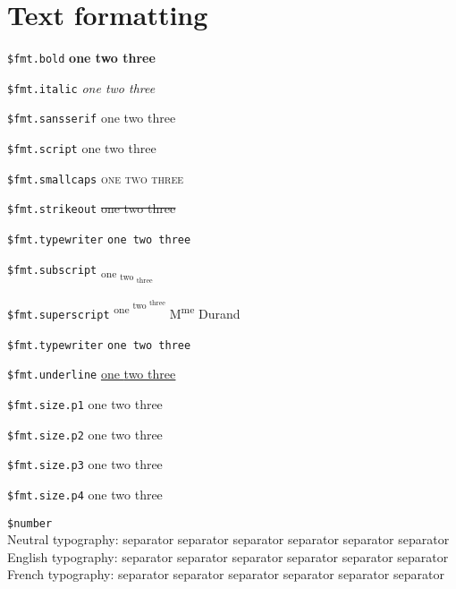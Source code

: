 \documentclass[demo]{pyscribe}
\newcommand\scripttext[1]{{\fontfamily{pzc}\selectfont\large#1}}
\begin{document}
\section{Text formatting}



\par\medskip
\texttt{\$fmt.bold}  \textbf{one
 \textbf{two
 \textbf{three}}}
\par\medskip
\texttt{\$fmt.italic}  \textit{one
 \textit{two
 \textit{three}}}
\par\medskip
\texttt{\$fmt.sansserif}  \textsf{one
 \textsf{two
 \textsf{three}}}
\par\medskip
\texttt{\$fmt.script}  \scripttext{one
 \scripttext{two
 \scripttext{three}}}
\par\medskip
\texttt{\$fmt.smallcaps}  \textsc{one
 \textsc{two
 \textsc{three}}}
\par\medskip
\texttt{\$fmt.strikeout}  \sout{one
 \sout{two
 \sout{three}}}
\par\medskip
\texttt{\$fmt.typewriter}  \texttt{one
 \texttt{two
 \texttt{three}}}
\par\medskip
\texttt{\$fmt.subscript}  \textsubscript{one
 \textsubscript{two
 \textsubscript{three}}}
\par\medskip
\texttt{\$fmt.superscript}  \textsuperscript{one
 \textsuperscript{two
 \textsuperscript{three}}} M\textsuperscript{me} Durand
\par\medskip
\texttt{\$fmt.typewriter}  \texttt{one
 \texttt{two
 \texttt{three}}}
\par\medskip
\texttt{\$fmt.underline}  \underline{one
 \underline{two
 \underline{three}}}
\par\medskip
\texttt{\$fmt.size.p1}  {\large one
 {\large two
 {\large three}}}
\par\medskip
\texttt{\$fmt.size.p2}  {\Large one
 {\Large two
 {\Large three}}}
\par\medskip
\texttt{\$fmt.size.p3}  {\LARGE one
 {\LARGE two
 {\LARGE three}}}
\par\medskip
\texttt{\$fmt.size.p4}  {\Huge one
 {\Huge two
 {\Huge three}}}

\par\medskip
\texttt{\$number} \\ Neutral typography: separator 
separator 
separator 
separator 
separator 
separator 
\\
English typography: separator 
separator 
separator 
separator 
separator 
separator 
\\
French typography: separator 
separator 
separator 
separator 
separator 
separator 
\\
\end{document}
